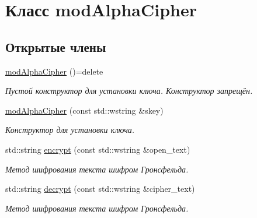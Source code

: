 \hypertarget{classmodAlphaCipher}{}\section{Класс mod\+Alpha\+Cipher}
\label{classmodAlphaCipher}
\subsection*{Открытые члены}
\begin{DoxyCompactItemize}
\item 
\hyperlink{classmodAlphaCipher_a4f0a86c20f5d836f66cb1e640d875e6b}{mod\+Alpha\+Cipher} ()=delete\hypertarget{classmodAlphaCipher_a4f0a86c20f5d836f66cb1e640d875e6b}{}\label{classmodAlphaCipher_a4f0a86c20f5d836f66cb1e640d875e6b}

\begin{DoxyCompactList}\small\item\em Пустой конструктор для установки ключа.  Конструктор запрещён. \end{DoxyCompactList}\item 
\hyperlink{classmodAlphaCipher_a314fca132f4e74faca280b7c1fad7cb5}{mod\+Alpha\+Cipher} (const std\+::wstring \&skey)
\begin{DoxyCompactList}\small\item\em Конструктор для установки ключа. \end{DoxyCompactList}\item 
std\+::string \hyperlink{classmodAlphaCipher_a9b586f4aa0c7424294a4df87b474777d}{encrypt} (const std\+::wstring \&open\+\_\+text)
\begin{DoxyCompactList}\small\item\em Метод шифрования текста шифром Гронсфельда. \end{DoxyCompactList}\item 
std\+::string \hyperlink{classmodAlphaCipher_a8396673a3de84ddde862b11cd18de9b1}{decrypt} (const std\+::wstring \&cipher\+\_\+text)
\begin{DoxyCompactList}\small\item\em Метод шифрования текста шифром Гронсфельда. \end{DoxyCompactList}\end{DoxyCompactItemize}
